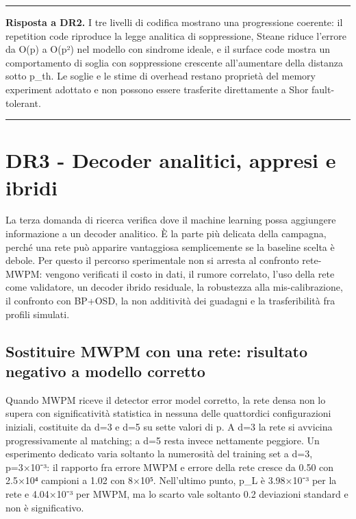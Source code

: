 \par\medskip\noindent\rule{\linewidth}{0.6pt}\par\nopagebreak
{\small{}\noindent \textbf{Risposta a DR2.} I tre livelli di codifica mostrano una progressione coerente: il repetition code riproduce la legge analitica di soppressione, Steane riduce l'errore da O(p) a O(p²) nel modello con sindrome ideale, e il surface code mostra un comportamento di soglia con soppressione crescente all'aumentare della distanza sotto p\_th. Le soglie e le stime di overhead restano proprietà del memory experiment adottato e non possono essere trasferite direttamente a Shor fault-tolerant.\par}
\nopagebreak\noindent\rule{\linewidth}{0.6pt}\par\medskip

\section{DR3 - Decoder analitici, appresi e ibridi}\label{sec:finale_5_3}\label{sec:decodifica_appresa}

La terza domanda di ricerca verifica dove il machine learning possa aggiungere informazione a un decoder analitico. È la parte più delicata della campagna, perché una rete può apparire vantaggiosa semplicemente se la baseline scelta è debole. Per questo il percorso sperimentale non si arresta al confronto rete-MWPM: vengono verificati il costo in dati, il rumore correlato, l'uso della rete come validatore, un decoder ibrido residuale, la robustezza alla mis-calibrazione, il confronto con BP+OSD, la non additività dei guadagni e la trasferibilità fra profili simulati.

\subsection{Sostituire MWPM con una rete: risultato negativo a modello corretto}\label{sec:finale_5_3_1}

Quando MWPM riceve il detector error model corretto, la rete densa non lo supera con significatività statistica in nessuna delle quattordici configurazioni iniziali, costituite da d=3 e d=5 su sette valori di p. A d=3 la rete si avvicina progressivamente al matching; a d=5 resta invece nettamente peggiore. Un esperimento dedicato varia soltanto la numerosità del training set a d=3, p=3×10⁻³: il rapporto fra errore MWPM e errore della rete cresce da 0.50 con 2.5×10⁴ campioni a 1.02 con 8×10⁵. Nell'ultimo punto, p\_L è 3.98×10⁻³ per la rete e 4.04×10⁻³ per MWPM, ma lo scarto vale soltanto 0.2 deviazioni standard e non è significativo.

